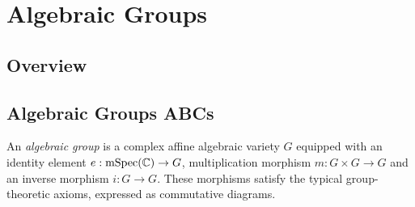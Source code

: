 \chapter{Algebraic Groups}

\section{Overview}
\label{sec:grp-motivation}


\section{Algebraic Groups ABCs}
\label{sec:basics-of-groups}

\begin{definition}
  An \emph{algebraic group} is a complex affine algebraic variety $G$ equipped with an identity element $e: \operatorname{mSpec}(\mathbb{C}) \to G$, multiplication morphism $m : G \times G \to G$ and an inverse morphism $i: G \to G$. These morphisms satisfy the typical group-theoretic axioms, expressed as commutative diagrams.
\end{definition}




